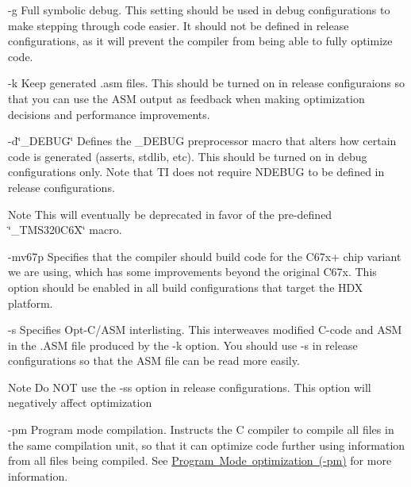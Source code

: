 \begin{DoxyItemize}
\item {\ttfamily -\/g}  Full symbolic debug. This setting should be used in debug configurations to make stepping through code easier. It should not be defined in release configurations, as it will prevent the compiler from being able to fully optimize code.  


\item {\ttfamily -\/k}  Keep generated .asm files. This should be turned on in release configuraions so that you can use the A\+SM output as feedback when making optimization decisions and performance improvements.  


\item {\ttfamily -\/d\char`\"{}\+\_\+\+D\+E\+B\+U\+G\char`\"{}}  Defines the {\ttfamily \+\_\+\+D\+E\+B\+UG} preprocessor macro that alters how certain code is generated (asserts, stdlib, etc). This should be turned on in debug configurations only. Note that TI does not require N\+D\+E\+B\+UG to be defined in release configurations.

\begin{DoxyNote}{Note}
This will eventually be deprecated in favor of the pre-\/defined \char`\"{}\+\_\+\+T\+M\+S320\+C6\+X\char`\"{} macro.
\end{DoxyNote}
 


\item {\ttfamily -\/mv67p}  Specifies that the compiler should build code for the C67x+ chip variant we are using, which has some improvements beyond the original C67x. This option should be enabled in all build configurations that target the H\+DX platform.  


\item {\ttfamily -\/s}  Specifies Opt-\/\+C/\+A\+SM interlisting. This interweaves modified C-\/code and A\+SM in the .A\+SM file produced by the {\ttfamily -\/k} option. You should use {\ttfamily -\/s} in release configurations so that the A\+SM file can be read more easily.

\begin{DoxyNote}{Note}
Do N\+OT use the {\ttfamily -\/ss} option in release configurations. This option will negatively affect optimization
\end{DoxyNote}
 


\item {\ttfamily -\/pm}  Program mode compilation. Instructs the C compiler to compile all files in the same compilation unit, so that it can optimize code further using information from all files being compiled. See \mbox{\hyperlink{a00832_subsubsection__program_mode_optimization_pm_}{Program Mode optimization (-\/pm)}} for more information.  



\end{DoxyItemize}
